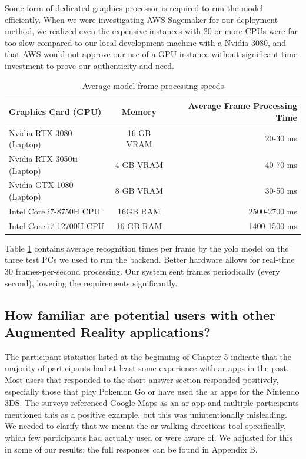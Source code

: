 \documentclass[thesis]{fputhesis}
\newcommand{\ra}[1]{\renewcommand{\arraystretch}{#1}}
\begin{document}
\begin{body}
Some form of dedicated graphics processor is required to run the model efficiently. When we were investigating AWS Sagemaker for our deployment method, we realized even the expensive instances with 20 or more CPUs were far too slow compared to our local development machine with a Nvidia 3080, and that AWS would not approve our use of a GPU instance without significant time investment to prove our authenticity and need. 
\begin{table}[h]\centering
\caption{Average model frame processing speeds}
\label{tab:frame-proc}
\ra{1.2}
    \begin{tabular}{@{}lcr@{}}
        \toprule
            \textbf{Graphics Card (GPU)}    &   \textbf{Memory}   &   \textbf{Average Frame Processing Time}  \\
        \midrule
            Nvidia RTX 3080 (Laptop)     & 16 GB VRAM   & 20-30 ms     \\
            Nvidia RTX 3050ti (Laptop)   &  4 GB VRAM   & 40-70 ms     \\
            Nvidia GTX 1080 (Laptop)     & 8 GB VRAM    & 30-50 ms     \\
            Intel Core i7-8750H CPU      & 16GB RAM     & 2500-2700 ms \\
            Intel Core i7-12700H CPU     & 16 GB RAM    & 1400-1500 ms \\
        \bottomrule
    \end{tabular}%
\end{table}
Table \ref{tab:frame-proc} contains average recognition times per frame by the \acrshort{yolo} model on the three test PCs we used to run the backend. Better hardware allows for real-time 30 frames-per-second processing.  Our system sent frames periodically (every second), lowering the requirements significantly.

\subsection{How familiar are potential users with other Augmented Reality applications?}
The participant statistics listed at the beginning of Chapter 5 indicate that the majority of participants had at least some experience with \acrshort{ar} apps in the past. Most users that responded to the short answer section responded positively, especially those that play Pokemon Go or have used the \acrshort{ar} apps for the Nintendo 3DS. The surveys referenced Google Maps as an \acrshort{ar} app and multiple participants mentioned this as a positive example, but this was unintentionally misleading. We needed to clarify that we meant the \acrshort{ar} walking directions tool specifically, which few participants had actually used or were aware of. We adjusted for this in some of our results; the full responses can be found in Appendix B.


\end{body}
\end{document}
